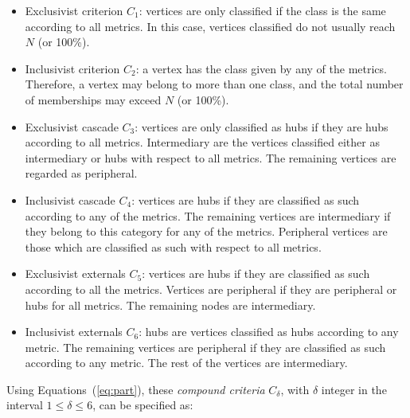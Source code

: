 \begin{itemize}
\item Exclusivist criterion $C_1$: vertices are only classified if the class is the same according to all metrics. In this case, vertices classified do not usually reach $N$ (or 100\%).

\item Inclusivist criterion $C_2$: a vertex has the class given by any of the metrics. Therefore, a vertex may belong to more than one class, and the total number of memberships may exceed $N$ (or 100\%).

\item Exclusivist cascade $C_3$: vertices are only classified as hubs if they are hubs according to all metrics. Intermediary are the vertices classified either as intermediary or hubs with respect to all metrics. The remaining vertices are regarded as peripheral.

\item Inclusivist cascade $C_4$: vertices are hubs if they are classified as such according to any of the metrics. The remaining vertices are intermediary if they belong to this category for any of the metrics. Peripheral vertices are those which are classified as such with respect to all metrics.

\item Exclusivist externals $C_5$: vertices are hubs if they are classified as such according to all the metrics. Vertices are peripheral if they are peripheral or hubs for all metrics. The remaining nodes are intermediary.

\item Inclusivist externals $C_6$: hubs are vertices classified as hubs according to any metric. The remaining vertices are peripheral if they are classified as such according to any metric. The rest of the vertices are intermediary.
\end{itemize}

Using Equations~(\ref{eq:part}), these \emph{compound criteria} $C_\delta$, with $\delta$ integer in the interval $1\leq\delta\leq6$, can be specified as:

